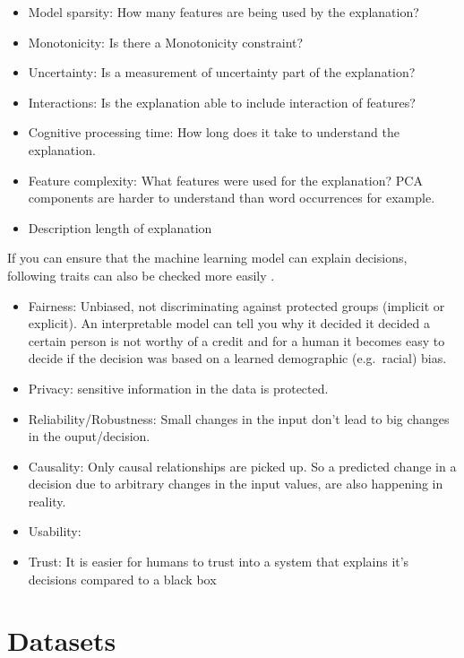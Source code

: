 \documentclass[12pt,]{krantz}
\providecommand{\tightlist}{%
  \setlength{\itemsep}{0pt}\setlength{\parskip}{0pt}}
\theoremstyle{definition}
\theoremstyle{definition}
\theoremstyle{definition}
\theoremstyle{remark}
\begin{document}
\begin{itemize}
\tightlist
\item
  Model sparsity: How many features are being used by the explanation?
\item
  Monotonicity: Is there a Monotonicity constraint?
\item
  Uncertainty: Is a measurement of uncertainty part of the explanation?
\item
  Interactions: Is the explanation able to include interaction of
  features?
\item
  Cognitive processing time: How long does it take to understand the
  explanation.
\item
  Feature complexity: What features were used for the explanation? PCA
  components are harder to understand than word occurrences for example.
\item
  Description length of explanation
\end{itemize}

If you can ensure that the machine learning model can explain decisions,
following traits can also be checked more easily
\citep{Doshi-Velez2017}.

\begin{itemize}
\tightlist
\item
  Fairness: Unbiased, not discriminating against protected groups
  (implicit or explicit). An interpretable model can tell you why it
  decided it decided a certain person is not worthy of a credit and for
  a human it becomes easy to decide if the decision was based on a
  learned demographic (e.g.~racial) bias.
\item
  Privacy: sensitive information in the data is protected.
\item
  Reliability/Robustness: Small changes in the input don't lead to big
  changes in the ouput/decision.
\item
  Causality: Only causal relationships are picked up. So a predicted
  change in a decision due to arbitrary changes in the input values, are
  also happening in reality.
\item
  Usability:
\item
  Trust: It is easier for humans to trust into a system that explains
  it's decisions compared to a black box
\end{itemize}

\chapter{Datasets}\label{data}
\end{document}
